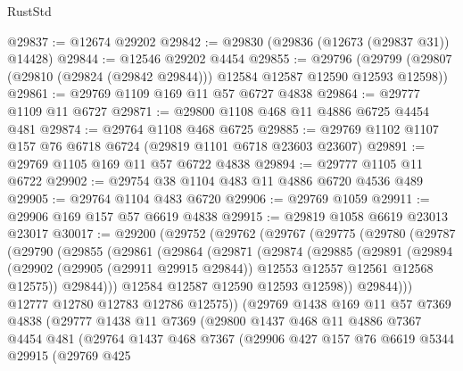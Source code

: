 \begin{lexlean}{RustStd}
\begin{coremodule}
{\begin{coremodule}
{{{{{{{{{{{{{{{{{{{{{{{{{{{{{{{{{{{{{{{{{{{{{{{{{{{{{{{{{{{{{{{{{{{{{{{{{{{{{{{{@29837 := @12674 @29202
@29842 := @29830 (@29836 (@12673 (@29837 @31)) @14428)
@29844 := @12546 @29202 @4454
@29855 := @29796
    (@29799 (@29807 (@29810 (@29824 (@29842 @29844))) @12584 @12587 @12590 @12593 @12598))
@29861 := @29769 @1109 @169 @11 @57 @6727 @4838
@29864 := @29777 @1109 @11 @6727
@29871 := @29800 @1108 @468 @11 @4886 @6725 @4454 @481
@29874 := @29764 @1108 @468 @6725
@29885 := @29769 @1102 @1107 @157 @76 @6718 @6724 (@29819 @1101 @6718 @23603 @23607)
@29891 := @29769 @1105 @169 @11 @57 @6722 @4838
@29894 := @29777 @1105 @11 @6722
@29902 := @29754 @38 @1104 @483 @11 @4886 @6720 @4536 @489
@29905 := @29764 @1104 @483 @6720
@29906 := @29769 @1059
@29911 := @29906 @169 @157 @57 @6619 @4838
@29915 := @29819 @1058 @6619 @23013 @23017
@30017 := @29200
    (@29752
      (@29762
        (@29767
          (@29775
            (@29780
              (@29787
                (@29790
                  (@29855
                    (@29861
                      (@29864
                        (@29871
                          (@29874
                            (@29885
                              (@29891
                                (@29894
                                  (@29902
                                    (@29905 (@29911 @29915 @29844))
                                    @12553
                                    @12557
                                    @12561
                                    @12568
                                    @12575))
                                @29844)))
                          @12584
                          @12587
                          @12590
                          @12593
                          @12598))
                      @29844)))
                @12777
                @12780
                @12783
                @12786
                @12575))
            (@29769
              @1438
              @169
              @11
              @57
              @7369
              @4838
              (@29777
                @1438
                @11
                @7369
                (@29800
                  @1437
                  @468
                  @11
                  @4886
                  @7367
                  @4454
                  @481
                  (@29764
                    @1437
                    @468
                    @7367
                    (@29906
                      @427
                      @157
                      @76
                      @6619
                      @5344
                      @29915
                      (@29769
                        @425
}}}}}}}}}}}}}}}}}}}}}}}}}}}}}}}}}}}}}}}}}}}}}}}}}}}}}}}}}}}}}}}}}}}}}}}}}}}}}}}}
\end{coremodule}}
\end{coremodule}
\end{lexlean}
